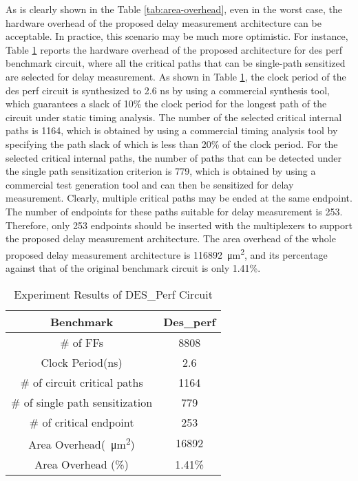 As is clearly shown in the Table \ref{tab:area-overhead}, even in the worst case, the hardware overhead of the proposed delay measurement architecture can be acceptable. In practice, this scenario may be much more optimistic. For instance, Table \ref{tab:des-perf} reports the hardware overhead of the proposed architecture for des perf benchmark circuit, where all the critical paths that can be single-path sensitized are selected for delay measurement. As shown in Table \ref{tab:des-perf}, the clock period of the des perf circuit is synthesized to 2.6 ns by using a commercial synthesis tool, which guarantees a slack of 10\% the clock period for the longest path of the circuit under static timing analysis. The number of the selected critical internal paths is 1164, which is obtained by using a commercial timing analysis tool by specifying the path slack of which is less than 20\% of the clock period. For the selected critical internal paths, the number of paths that can be detected under the single path sensitization criterion is 779, which is obtained by using a commercial test generation tool and can then be sensitized for delay measurement. Clearly, multiple critical paths may be ended at the same endpoint. The number of endpoints for these paths suitable for delay measurement is 253. Therefore, only 253 endpoints should be inserted with the multiplexers to support the proposed delay measurement architecture. The area overhead of the whole proposed delay measurement architecture is \SI{116892}{\micro\metre^2}, and its percentage against that of the original benchmark circuit is only 1.41\%.

\begin{table}[]
    \scriptsize
    \caption{Experiment Results of DES\_Perf Circuit} \label{tab:des-perf}
    \begin{tabular}{|c|c|}
        \hline
        Benchmark                       & Des\_perf \\ \hline
        \# of FFs                       & 8808      \\ \hline
        Clock Period(ns)                & 2.6       \\ \hline
        \# of circuit critical paths    & 1164      \\ \hline
        \# of single path sensitization & 779       \\ \hline
        \# of critical endpoint         & 253       \\ \hline
        Area Overhead(\SI{}{\micro\metre^2})              & 16892     \\ \hline
        Area Overhead (\%)              & 1.41\%    \\ \hline
    \end{tabular}
\end{table}



